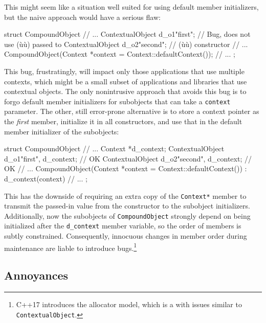 This might seem like a situation well suited for using default member
initializers, but the naive approach would have a serious flaw:

\begin{emcppslisting}[emcppsbatch=e7]
struct CompoundObject
{
// ...
    ContextualObject d_o1{"first"};   // Bug, does not use (ù{}ù) passed to
    ContextualObject d_o2{"second"};  // (ù{}ù) constructor
// ...
    CompoundObject(Context *context = Context::defaultContext());
// ...
};
\end{emcppslisting}
    

This bug, frustratingly, will impact only those applications that use
multiple contexts, which might be a small subset of applications and
libraries that use contextual objects. The only nonintrusive approach
that avoids this bug is to forgo default member initializers for
subobjects that can take a \lstinline!context! parameter. The other, still
error-prone alternative is to store a context pointer as the
\emph{first} member, initialize it in all constructors, and use that in
the default member initializer of the subobjects:

\begin{emcppslisting}[emcppsbatch=e8]
struct CompoundObject
{
// ...
    Context          *d_context;
    ContextualObject  d_o1{"first", d_context};   // OK
    ContextualObject  d_o2{"second", d_context};  // OK
// ...
    CompoundObject(Context *context = Context::defaultContext())
    : d_context(context)
    { }
// ...
};
\end{emcppslisting}
    

This has the downside of requiring an extra copy of the
\lstinline!Context*! member to transmit the passed-in value from the
constructor to the subobject initializers. Additionally, now the
subobjects of \lstinline!CompoundObject! strongly depend on being
initialized after the \lstinline!d_context! member variable, so the order
of members is subtly constrained. Consequently, innocuous changes in
member order during maintenance are liable to introduce
bugs.{\cprotect\footnote{C++17 introduces the  allocator model, which is a 
  with issues similar to \lstinline!ContextualObject!.}}

\subsection[Annoyances]{Annoyances}\label{annoyances}

